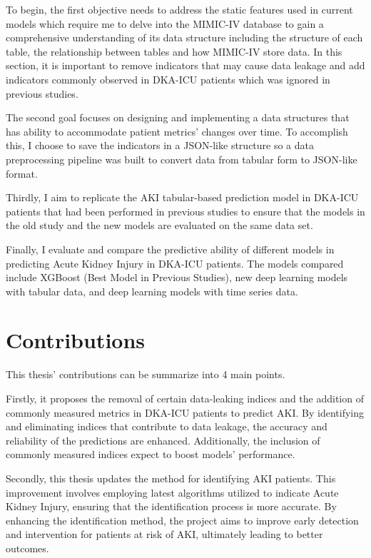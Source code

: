 \documentclass[../main.tex]{subfiles}
\begin{document}
To begin, the first objective needs to address the static features used  in current models which require me to delve into the MIMIC-IV database to gain a comprehensive understanding of its data structure including the structure of each table, the relationship between tables and how MIMIC-IV store data.
In this section, it is important to remove indicators that may cause data leakage and add indicators commonly observed in DKA-ICU patients which was ignored in previous studies.

The second goal focuses on designing and implementing a data structures that has ability to accommodate patient metrics' changes over time.
To accomplish this, I choose to save the indicators in a JSON-like structure so a data preprocessing pipeline was built to convert data from tabular form to JSON-like format.

Thirdly, I aim to replicate the AKI tabular-based prediction model in DKA-ICU patients that had been performed in previous studies to ensure that the models in the old study and the new models are evaluated on the same data set.

Finally, I evaluate and compare the predictive ability of different models in predicting Acute Kidney Injury in DKA-ICU patients.
The models compared include XGBoost (Best Model in Previous Studies), new deep learning models with tabular data, and deep learning models with time series data.

\section{Contributions}

This thesis' contributions can be summarize into 4 main points.

Firstly, it proposes the removal of certain data-leaking indices and the addition of commonly measured metrics in DKA-ICU patients to predict AKI. 
By identifying and eliminating indices that contribute to data leakage, the accuracy and reliability of the predictions are enhanced. 
Additionally, the inclusion of commonly measured indices expect to boost models' performance.

Secondly, this thesis updates the method for identifying AKI patients. This improvement involves employing latest algorithms utilized to indicate Acute Kidney Injury, ensuring that the identification process is more accurate.
By enhancing the identification method, the project aims to improve early detection and intervention for patients at risk of AKI, ultimately leading to better outcomes.
\end{document}
